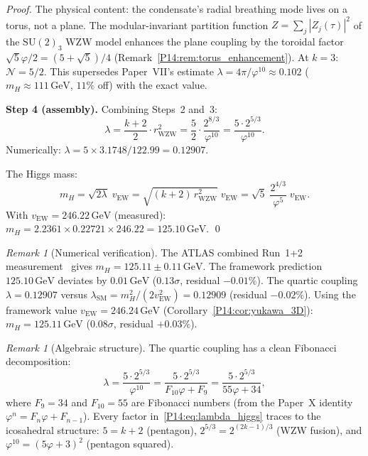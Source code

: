 \documentclass[11pt,a4paper]{article}
\theoremstyle{definition}
\theoremstyle{remark}
\newtheorem{remark}[theorem]{Remark}
\newcommand{\vp}{\varphi}
\newcommand{\vEW}{v_{\mathrm{EW}}}
\newcommand{\mH}{m_H}
\begin{document}
\begin{proof}
The physical content: the condensate's radial breathing mode
lives on a torus, not a plane.  The modular-invariant partition
function $Z=\sum_{j}|Z_j(\tau)|^2$ of the $\mathrm{SU}(2)_3$ WZW model
enhances the plane coupling by the toroidal factor
$\sqrt{5}\vp/2 = (5+\sqrt{5})/4$
(Remark~\ref{P14:rem:torus_enhancement}).
At $k=3$: $\mathcal{N} = 5/2$.
This supersedes Paper~VII's estimate $\lambda=4\pi/\vp^{10}\approx0.102$
($\mH\approx111\,\mathrm{GeV}$, $11\%$ off) with the exact value.

\textbf{Step 4 (assembly).}
Combining Steps~2 and~3:
\begin{equation}
  \lambda = \frac{k+2}{2}\cdot r_{\mathrm{WZW}}^2
  = \frac{5}{2}\cdot\frac{2^{8/3}}{\vp^{10}}
  = \frac{5\cdot 2^{5/3}}{\vp^{10}}.
\end{equation}
Numerically: $\lambda = 5\times3.1748/122.99 = 0.12907$.

The Higgs mass:
\begin{equation}
  \mH = \sqrt{2\lambda}\;\vEW
  = \sqrt{(k+2)\,r_{\mathrm{WZW}}^2}\;\vEW
  = \sqrt{5}\;\frac{2^{4/3}}{\vp^5}\;\vEW.
\end{equation}
With $\vEW = 246.22\,\mathrm{GeV}$ (measured):
$\mH = 2.2361\times0.22721\times246.22 = 125.10\,\mathrm{GeV}$.
\qed
\end{proof}

\begin{remark}[Numerical verification]
\label{P14:rem:higgs_numerics}
The ATLAS combined Run~1+2 measurement~\cite{ATLAS_mH} gives
$\mH = 125.11\pm0.11\,\mathrm{GeV}$.
The framework prediction $125.10\,\mathrm{GeV}$ deviates by
$0.01\,\mathrm{GeV}$ ($0.13\sigma$, residual $-0.01\%$).
The quartic coupling $\lambda = 0.12907$ versus
$\lambda_{\mathrm{SM}} = \mH^2/(2\vEW^2) = 0.12909$
(residual $-0.02\%$).
Using the framework value $\vEW=246.24\,\mathrm{GeV}$
(Corollary~\ref{P14:cor:yukawa_3D}):
$\mH = 125.11\,\mathrm{GeV}$ ($0.08\sigma$, residual $+0.03\%$).
\end{remark}

\begin{remark}[Algebraic structure]
\label{P14:rem:higgs_algebra}
The quartic coupling has a clean Fibonacci decomposition:
\begin{equation}
  \lambda = \frac{5\cdot2^{5/3}}{\vp^{10}}
  = \frac{5\cdot2^{5/3}}{F_{10}\vp + F_9}
  = \frac{5\cdot2^{5/3}}{55\vp+34},
  \label{P14:eq:lambda_fibonacci}
\end{equation}
where $F_9=34$ and $F_{10}=55$ are Fibonacci numbers
(from the Paper~X identity $\vp^n = F_n\vp + F_{n-1}$).
Every factor in~\eqref{P14:eq:lambda_higgs} traces to the icosahedral
structure: $5=k+2$ (pentagon), $2^{5/3}=2^{(2k-1)/3}$
(WZW fusion), and $\vp^{10}=(5\vp+3)^2$ (pentagon squared).
\end{remark}
\end{document}
